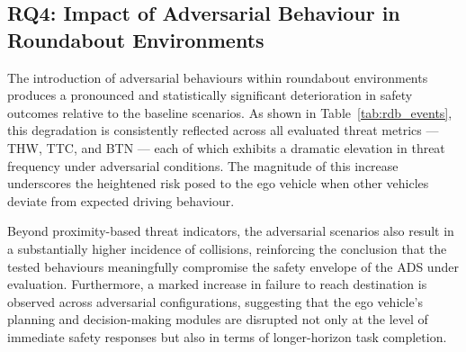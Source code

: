 
\subsection{RQ4: Impact of Adversarial Behaviour in Roundabout Environments}

The introduction of adversarial behaviours within roundabout environments produces a pronounced and statistically significant deterioration in safety outcomes relative to the baseline scenarios. As shown in Table~\ref{tab:rdb_events}, this degradation is consistently reflected across all evaluated threat metrics — THW, TTC, and BTN — each of which exhibits a dramatic elevation in threat frequency under adversarial conditions. The magnitude of this increase underscores the heightened risk posed to the ego vehicle when other vehicles deviate from expected driving behaviour.

Beyond proximity-based threat indicators, the adversarial scenarios also result in a substantially higher incidence of collisions, reinforcing the conclusion that the tested behaviours meaningfully compromise the safety envelope of the ADS under evaluation. Furthermore, a marked increase in failure to reach destination is observed across adversarial configurations, suggesting that the ego vehicle's planning and decision-making modules are disrupted not only at the level of immediate safety responses but also in terms of longer-horizon task completion.

